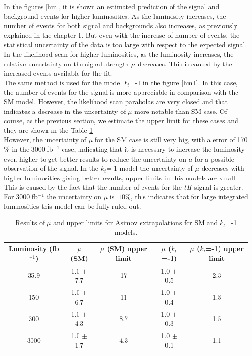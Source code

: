 	In the figures \ref{hm}, it is shown an estimated prediction of the signal and background events for higher luminosities. As the luminosity increases, the number of events for both signal and backgrounds also increases, as previously explained in the chapter 1. But even with the increase of number of events, the statistical uncertainty of the data is too large with respect to the expected signal. In the likelihood scan for higher luminosities, as the luminosity increases, the relative uncertainty on the signal strength $\mu$ decreases. This is caused by the increased events available for the fit. \\
	
	The same method is used for the model $k_t$=-1 in the figure \ref{hm1}. In this case, the number of events for the signal is more appreciable in comparison with the SM model. However, the likelihood scan parabolas are very closed and that indicates a decrease in the uncertainty of $\mu$ more notable than SM case. 
	Of course, as the previous section, we estimate the upper limit for these cases and they are shown in the Table \ref{upper}\\
	
	However, the uncertainty of $\mu$ for the SM case is still very big, with a error of 170$\%$ in the 3000 fb$^{-1}$ case, indicating that it is necessary to increase the luminosity even higher to get better results to reduce the uncertainty on $\mu$ for a possible observation of the signal. 
	In the $k_t$=-1 model the uncertainty of $\mu$ decreases with higher luminosities giving better results; upper limits in this models are small. This is caused by the fact that the number of events for the $tH$ signal is greater. For 3000 fb$^{-1}$ the uncertainty on $\mu$ is $~10\%$, this indicates that for large integrated luminosities this model can be fully ruled out.

	\begin{table}[ht!]
		\caption{Results of $\mu$ and upper limits for Asimov extrapolations for SM and $k_t$=-1 models.}
		\begin{tabular}{|c|c|c|c|c|}
			\hline
			Luminosity (fb$^{-1}$)	&$\mu$ (SM) &$\mu$ (SM) upper limit & $\mu$ ($k_t$=-1) &$\mu$ ($k_t$=-1) upper limit \\
			\hline
			35.9 & 1.0 $\pm$ 7.7 & 17 & 1.0 $\pm$ 0.5 & 2.3 \\
			\hline
			150& 1.0 $\pm$ 6.7& 11 & 1.0 $\pm$ 0.4 &1.8\\
			\hline
			300&1.0 $\pm$ 4.3 &8.7 & 1.0 $\pm$ 0.3 &1.5 \\
			\hline
			3000&1.0 $\pm$ 1.7 & 4.3 &	 1.0 $\pm$ 0.1 & 1.1\\
			\hline
		\end{tabular}
		\label{upper}
	\end{table}
	
